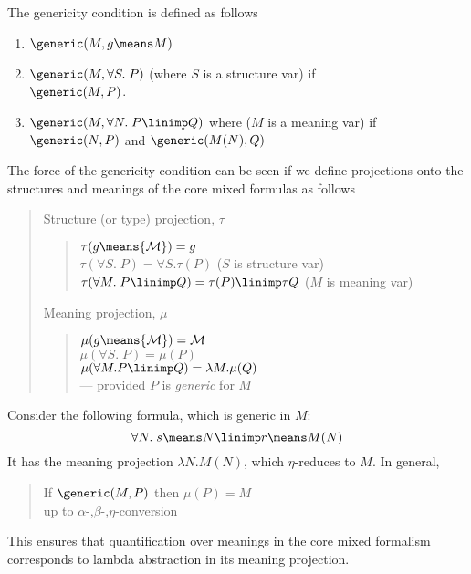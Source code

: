 The genericity condition is defined as follows
\begin{enumerate}
\item $\generic(M,g\means M)$
\item $\generic(M,\forall S.\;P)$ (where $S$ is a structure var) if\\ 
      $\generic(M,P)$. 
\item $\generic(M,\forall N.\;P\linimp Q)$ where ($M$ is a  meaning var) if\\
      $\generic(N,P)$ and $\generic(M(N),Q)$
\end{enumerate}
The force of the genericity condition can be seen if we define
projections onto the structures and meanings of the core mixed formulas
as follows
\begin{quote}
Structure (or type) projection, $\tau$
\begin{quote}
$\tau(g\means {\cal M}) = g$\\
$\tau(\forall S.\;P) = \forall S.\tau(P)$ ($S$ is structure var)\\
$\tau(\forall M.\; P\linimp Q) = \tau(P)\linimp \tau{Q}$ 
     ($M$ is meaning var)
\end{quote}

Meaning projection, $\mu$
\begin{quote}
$\mu(g\means {\cal M}) = {\cal M}$\\
$\mu(\forall S.\;P) = \mu(P)$\\
$\mu(\forall M. P\linimp Q) = \lambda M.\mu(Q)$\\
\hspace*{2em} --- provided $P$ is {\em generic} for $M$
\end{quote}
\end{quote}
Consider the following formula, which is generic in $M$:
\[\forall N.\; s\means N \linimp r\means M(N)\]
It has the meaning projection $\lambda N.M(N)$, which
$\eta$-reduces to $M$.  In general, 
\begin{quote}
If $\generic(M,P)$ then $\mu(P) = M$\\
up to $\alpha$-,$\beta$-,$\eta$-conversion
\end{quote}
This ensures that quantification over meanings in the core
mixed formalism corresponds to lambda abstraction in its meaning
projection.

